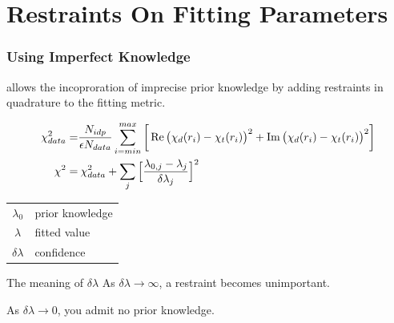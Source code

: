 \documentclass[10pt, xcolor=x11names, compress]{beamer}
\begin{document}
\section[Restraints]{Restraints On Fitting Parameters}
\begin{frame}
  \frametitle{Using Imperfect Knowledge}

  {\ifeffit} allows the incoproration of imprecise
  \alert{prior knowledge} by adding restraints in quadrature
  to the fitting metric.

  {\small
    \begin{align}
      \chi^2_{data} =& \frac{N_{idp}}{\epsilon N_{data}}
                      \sum\limits_{i=min}^{max} 
                        \bigg[\Re\big(\chi_d(r_i)-\chi_t(r_i)\big)^2 + 
                              \Im\big(\chi_d(r_i)-\chi_t(r_i)\big)^2\bigg]
                      \notag \\
     \chi^2 =& \> \chi^2_{data} + \sum\limits_{j}\Big[\frac{\lambda_{0,j} -
       \lambda_j}{\delta\lambda_j}\Big]^2 \label{eq:restraint}
   \end{align}
  }
  \begin{center}
    \begin{tabular}{cl}
      $\lambda_0$     & prior knowledge \\
      $\lambda$       & fitted value    \\
      $\delta\lambda$ & confidence      \\
    \end{tabular}
  \end{center}
  \begin{block}{The meaning of $\delta\lambda$}
      As $\delta\lambda\rightarrow\infty$, a restraint becomes unimportant.

      As $\delta\lambda\rightarrow0$, you admit no prior knowledge.
  \end{block}
\end{frame}
\end{document}
